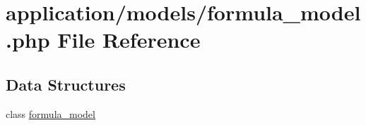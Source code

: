 \hypertarget{formula__model_8php}{\section{application/models/formula\-\_\-model.php File Reference}
\label{formula__model_8php}
}
\subsection*{Data Structures}
\begin{DoxyCompactItemize}
\item 
class \hyperlink{classformula__model}{formula\-\_\-model}
\end{DoxyCompactItemize}
